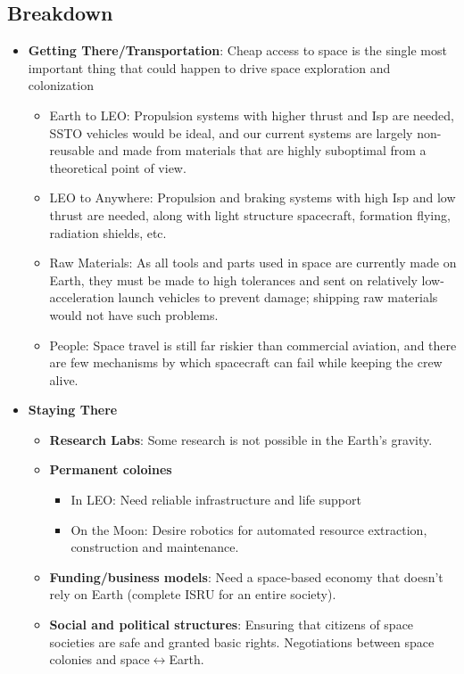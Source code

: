 \documentclass[letter,11pt]{article}
\begin{document}
\subsection{Breakdown}
\begin{itemize}
	\item \textbf{Getting There/Transportation}: Cheap access to space is the single most important thing that could happen to drive space exploration and colonization \begin{itemize}
			\item Earth to \gls{LEO}: Propulsion systems with higher thrust and \gls{Isp} are needed, \gls{SSTO} vehicles would be ideal, and our current systems are largely non-reusable and made from materials that are highly suboptimal from a theoretical point of view.
			\item \gls{LEO} to Anywhere: Propulsion and braking systems with high \gls{Isp} and low thrust are needed, along with light structure spacecraft, formation flying, radiation shields, etc.
				\item Raw Materials: As all tools and parts used in space are currently made on Earth, they must be made to high tolerances and sent on relatively low-acceleration launch vehicles to prevent damage; shipping raw materials would not have such problems.
				\item People: Space travel is still far riskier than commercial aviation, and there are few mechanisms by which spacecraft can fail while keeping the crew alive.
			\end{itemize}
	\item \textbf{Staying There} \begin{itemize}
			\item \textbf{Research Labs}: Some research is not possible in the Earth's gravity.
			\item \textbf{Permanent coloines} \begin{itemize}
					\item In \gls{LEO}: Need reliable infrastructure and life support
					\item On the Moon: Desire robotics for automated resource extraction, construction and maintenance.
				\end{itemize}
			\item \textbf{Funding/business models}: Need a space-based economy that doesn't rely on Earth (complete \gls{ISRU} for an entire society).
			\item \textbf{Social and political structures}: Ensuring that citizens of space societies are safe and granted basic rights. Negotiations between space colonies and space$\leftrightarrow$Earth.

\end{itemize}
\end{itemize}
\end{document}
